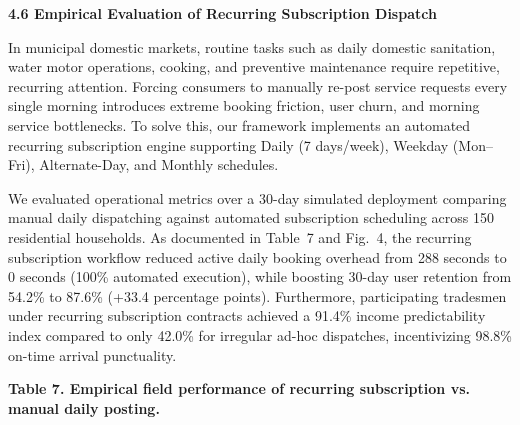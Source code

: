 \documentclass[10pt,twocolumn,a4paper]{article}
\begin{document}
\vspace{0.3em}
\noindent
\textbf{4.6 Empirical Evaluation of Recurring Subscription Dispatch}

In municipal domestic markets, routine tasks such as daily domestic sanitation, water motor operations, cooking, and preventive maintenance require repetitive, recurring attention. Forcing consumers to manually re-post service requests every single morning introduces extreme booking friction, user churn, and morning service bottlenecks. To solve this, our framework implements an automated recurring subscription engine supporting Daily (7 days/week), Weekday (Mon--Fri), Alternate-Day, and Monthly schedules.

We evaluated operational metrics over a 30-day simulated deployment comparing manual daily dispatching against automated subscription scheduling across 150 residential households. As documented in Table~7 and Fig.~4, the recurring subscription workflow reduced active daily booking overhead from 288 seconds to 0 seconds (100\% automated execution), while boosting 30-day user retention from 54.2\% to 87.6\% (+33.4 percentage points). Furthermore, participating tradesmen under recurring subscription contracts achieved a 91.4\% income predictability index compared to only 42.0\% for irregular ad-hoc dispatches, incentivizing 98.8\% on-time arrival punctuality.

\vspace{0.3em}
\noindent
\textbf{Table 7. Empirical field performance of recurring subscription vs. manual daily posting.}
\vspace{0.2em}

\noindent
{}
\end{document}
